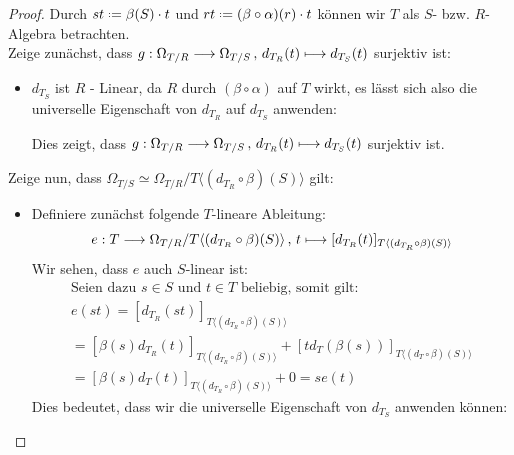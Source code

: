 \documentclass[10pt,a4paper]{report}
\newcommand{\function}[5]{\nolinebreak{#1:#2 \longrightarrow #3 \, , \, #4 \longmapsto #5}}
\newcommand{\divR}[2]{\Omega_{#1/#2}}
\newcommand{\divf}[1]{d_{#1}}
\newcommand*{\defeq}{\mathrel{\vcenter{\baselineskip0.5ex \lineskiplimit0pt
                     \hbox{\scriptsize.}\hbox{\scriptsize.}}}%
                     =}
\begin{document}
\begin{proof}
Durch $st \defeq \beta (S) \cdot t$ und $rt \defeq (\beta \circ \alpha) (r) \cdot t$ können wir $T$ als $S$- bzw. $R$-Algebra betrachten.\\
Zeige zunächst, dass $\function{g}{\divR{T}{R}}{\divR{T}{S}}{\divf{T_R}(t)}{\divf{T_S}(t)}$ surjektiv ist:
\begin{itemize}
\item[]
$\divf{T_S}$ ist $R$ - Linear, da $R$ durch $(\beta \circ \alpha)$ auf $T$ wirkt, es lässt sich also die universelle Eigenschaft von $\divf{T_R}$ auf $\divf{T_S}$ anwenden:
\begin{center}
\end{center}
Dies zeigt, dass $\function{g}{\divR{T}{R}}{\divR{T}{S}}{\divf{T_R}(t)}{\divf{T_S}(t)}$ surjektiv ist.
\end{itemize}
Zeige nun, dass $\divR{T}{S} \simeq \divR{T}{R}/T \langle (\divf{T_R} \circ \beta)(S) \rangle$ gilt:
\begin{itemize}
\item[] Definiere zunächst folgende $T$-lineare Ableitung:
\begin{gather*}
\function{e}{T}{\divR{T}{R} / T \langle (\divf{T_R} \circ \beta)(S) \rangle }{t}{[\divf{T_R}(t)]_{T \langle (\divf{T_R} \circ \beta)(S) \rangle}}
\end{gather*}
Wir sehen, dass $e$ auch $S$-linear ist:
\begin{gather*}
\text{Seien dazu } s \in S \text{ und } t \in T \text{ beliebig, somit gilt:}\\
e(st) = [\divf{T_R}(st)]_{T \langle (\divf{T_R} \circ \beta)(S) \rangle}\\
=[\beta(s) \divf{T_R}(t)]_{T \langle (\divf{T_R} \circ \beta)(S) \rangle} + [t \divf{T}(\beta(s))]_{T \langle (\divf{T} \circ \beta)(S) \rangle}\\
= [\beta(s) \divf{T}(t)]_{T \langle (\divf{T_R} \circ \beta)(S) \rangle} + 0 = se(t)
\end{gather*}
Dies bedeutet, dass wir die universelle Eigenschaft von $\divf{T_S}$ anwenden können:
\begin{center}
\end{center}
\end{itemize}
\end{proof}
\end{document}
